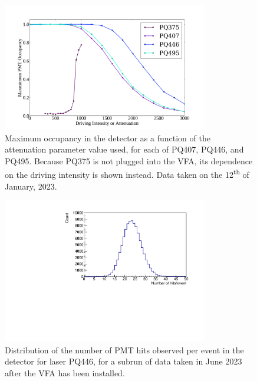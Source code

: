 \begin{figure}
    \centering
    \includegraphics[width=0.8\textwidth]{3_SMELLIEHardware/images/smellie_intensity_scan_new.pdf}
    \caption[Maximum occupancy in the detector as a function of the attenuation parameter value used]
    {Maximum occupancy in the detector as a function of the attenuation parameter value used, for each of PQ407, PQ446, and PQ495. Because PQ375 is not plugged into the VFA, its dependence on the driving intensity is shown instead. Data taken on the 12\textsuperscript{th} of January, 2023.}
    \label{fig:pq_new_intensity_dependence}
\end{figure}

\begin{figure}
    \centering
    \includegraphics[width=0.8\textwidth]{3_SMELLIEHardware/images/nhit_dist_310296_8.pdf}
    \caption[Distribution of the number of PMT hits observed per event for laser PQ446, after the VFA was added]
    {Distribution of the number of PMT hits observed per event in the detector for laser PQ446, for a subrun of data taken in June 2023 after the VFA has been installed.}
    \label{fig:pq_nhit_dist_post_vfa}
\end{figure}

